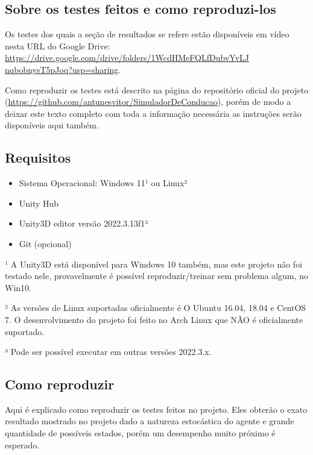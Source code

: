 \begin{apendicesenv}

\partapendices

\chapter{Sobre os testes feitos e como reproduzi-los}

Os testes dos quais a seção de resultados se refere estão disponíveis em vídeo nesta URL do Google Drive: \href{https://drive.google.com/drive/folders/1WcdHMeFQLfDubvYvLJnqbobnysT5pJoq?usp=sharing}{https://drive.google.com/drive/folders/1WcdHMeFQLfDubvYvLJ\\nqbobnysT5pJoq?usp=sharing}.

Como reproduzir os testes está descrito na página do repositório oficial do projeto (\href{https://github.com/antunesvitor/SimuladorDeConducao}{https://github.com/antunesvitor/SimuladorDeConducao}), porém de modo a deixar este texto completo com toda a informação necessária as instruções serão disponíveis aqui também.

\section*{Requisitos}

\begin{itemize}
    \item Sistema Operacional: Windows 11¹  ou Linux²
    \item Unity Hub
    \item Unity3D editor versão 2022.3.13f1³
    \item Git (opcional)
\end{itemize}

¹ A Unity3D está disponível para Windows 10 também, mas este projeto não foi testado nele, provavelmente é possível reproduzir/treinar sem problema algum, no Win10.

² As versões de Linux suportadas oficialmente é O Ubuntu 16.04, 18.04 e CentOS 7.  O desenvolvimento do projeto foi feito no Arch Linux que NÃO é oficialmente suportado.

³ Pode ser possível executar em outras versões 2022.3.x.

\section*{Como reproduzir} 
Aqui é explicado como reproduzir os testes feitos no projeto. Eles obterão o exato resultado mostrado no projeto dado a natureza estocástica do agente e grande quantidade de possíveis estados, porém um desempenho muito próximo é esperado.


\end{apendicesenv}
